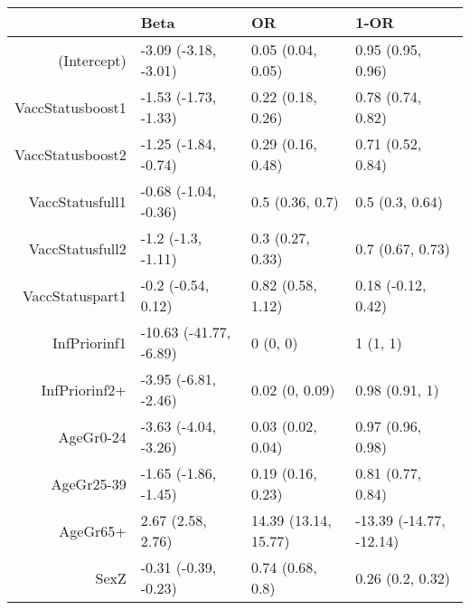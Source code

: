 \begin{table}[ht]
\centering
\begin{tabular}{rlll}
  \hline
 & Beta & OR & 1-OR \\ 
  \hline
(Intercept) & -3.09 (-3.18, -3.01) & 0.05 (0.04, 0.05) & 0.95 (0.95, 0.96) \\ 
  VaccStatusboost1 & -1.53 (-1.73, -1.33) & 0.22 (0.18, 0.26) & 0.78 (0.74, 0.82) \\ 
  VaccStatusboost2 & -1.25 (-1.84, -0.74) & 0.29 (0.16, 0.48) & 0.71 (0.52, 0.84) \\ 
  VaccStatusfull1 & -0.68 (-1.04, -0.36) & 0.5 (0.36, 0.7) & 0.5 (0.3, 0.64) \\ 
  VaccStatusfull2 & -1.2 (-1.3, -1.11) & 0.3 (0.27, 0.33) & 0.7 (0.67, 0.73) \\ 
  VaccStatuspart1 & -0.2 (-0.54, 0.12) & 0.82 (0.58, 1.12) & 0.18 (-0.12, 0.42) \\ 
  InfPriorinf1 & -10.63 (-41.77, -6.89) & 0 (0, 0) & 1 (1, 1) \\ 
  InfPriorinf2+ & -3.95 (-6.81, -2.46) & 0.02 (0, 0.09) & 0.98 (0.91, 1) \\ 
  AgeGr0-24 & -3.63 (-4.04, -3.26) & 0.03 (0.02, 0.04) & 0.97 (0.96, 0.98) \\ 
  AgeGr25-39 & -1.65 (-1.86, -1.45) & 0.19 (0.16, 0.23) & 0.81 (0.77, 0.84) \\ 
  AgeGr65+ & 2.67 (2.58, 2.76) & 14.39 (13.14, 15.77) & -13.39 (-14.77, -12.14) \\ 
  SexZ & -0.31 (-0.39, -0.23) & 0.74 (0.68, 0.8) & 0.26 (0.2, 0.32) \\ 
   \hline
\end{tabular}
\end{table}
